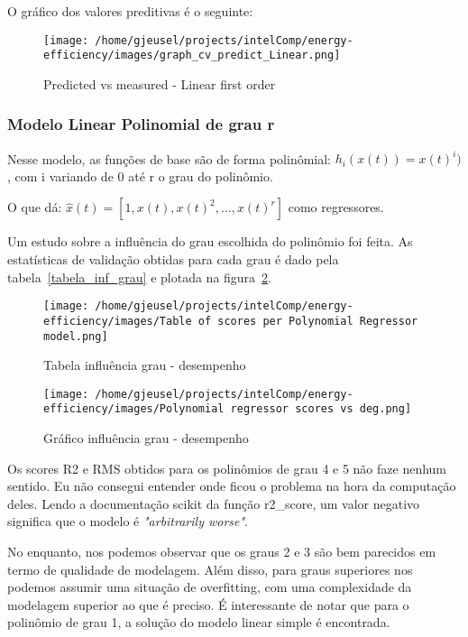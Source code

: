 \documentclass[paper=a4, fontsize=11pt]{article} %
\numberwithin{equation}{section} %
\numberwithin{figure}{section} %
\numberwithin{table}{section} %
\begin{document}
O gráfico dos valores preditivas é o seguinte:
\begin{figure}[H] %
\begin{center}
\texttt{[image: /home/gjeusel/projects/intelComp/energy-efficiency/images/graph\_cv\_predict\_Linear.png]}
\end{center}
\caption{Predicted vs measured - Linear first order}
\label{PvsM_Linear_First_Order}
\end{figure}

\subsubsection{Modelo Linear Polinomial de grau r}
Nesse modelo, as funções de base são de forma polinômial: $h_i(x(t)) = x(t)^{i})$, com i variando de 0 até r o grau do polinômio.

O que dá: $\hat{x}(t) = [1, x(t), x(t)^{2}, ..., x(t)^{r}]$ como regressores.

Um estudo sobre a influência do grau escolhida do polinômio foi feita.
As estatísticas de validação obtidas para cada grau é dado pela tabela~\ref{tabela_inf_grau} e plotada na figura~\ref{graph_inf_grau}.\newline

\begin{figure}[H] %
\begin{center}
\texttt{[image: /home/gjeusel/projects/intelComp/energy-efficiency/images/Table of scores per Polynomial Regressor model.png]}
\caption{Tabela influência grau - desempenho}
\label{tabela_inf_grau}
\bigskip
\bigskip
\texttt{[image: /home/gjeusel/projects/intelComp/energy-efficiency/images/Polynomial regressor scores vs deg.png]}
\caption{Gráfico influência grau - desempenho}
\label{graph_inf_grau}
\end{center}
\end{figure}

Os scores R2 e RMS obtidos para os polinômios de grau 4 e 5 não faze nenhum sentido.
Eu não consegui entender onde ficou o problema na hora da computação deles.
Lendo a documentação scikit da função r2\_score, um valor negativo significa que o modelo é \emph{"arbitrarily worse"}.

No enquanto, nos podemos observar que os graus 2 e 3 são bem parecidos em termo de qualidade de modelagem.
Além disso, para graus superiores nos podemos assumir uma situação de overfitting, com uma complexidade da modelagem superior ao que é preciso.\newline
É interessante de notar que para o polinômio de grau 1, a solução do modelo linear simple é encontrada.
\end{document}
